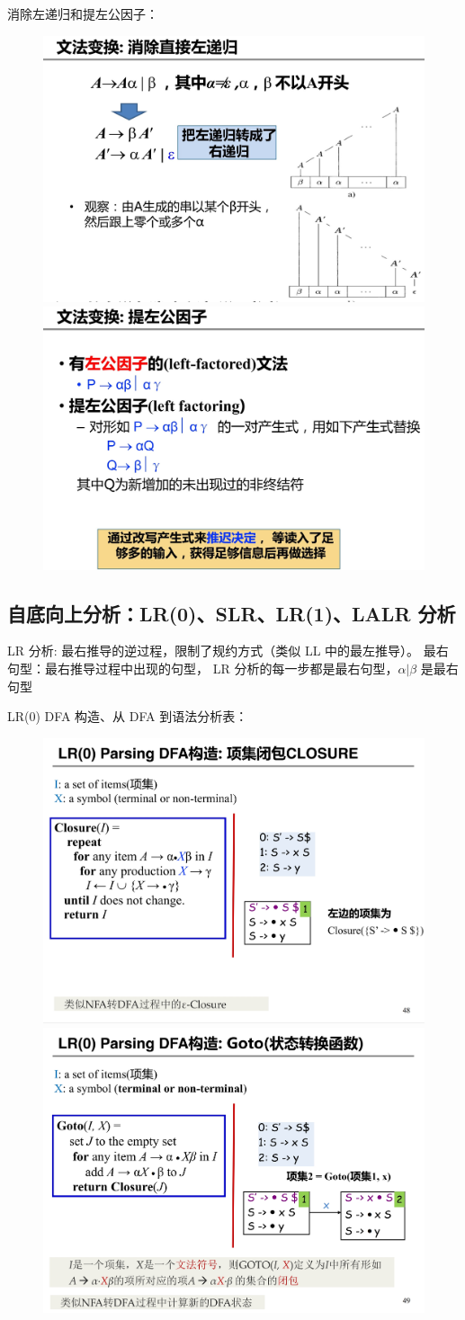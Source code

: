 \par \noindent 消除左递归和提左公因子：

\begin{figure}[H]
    \centering
    \includegraphics[width=0.48\linewidth]{figures/ll1gramma2.png}
    \includegraphics[width=0.48\linewidth]{figures/ll1gramma1.png}
\end{figure}

\subsection*{自底向上分析：LR(0)、SLR、LR(1)、LALR 分析}

\par \noindent LR 分析: 最右推导的逆过程，限制了规约方式（类似 LL 中的最左推导）。
最右句型：最右推导过程中出现的句型， LR 分析的每一步都是最右句型，$\alpha | \beta$ 是最右句型

\par \noindent LR(0) DFA 构造、从 DFA 到语法分析表：

\begin{figure}[H]
    \centering
    \includegraphics[width=0.48\linewidth]{figures/lr0-1.png}
    \includegraphics[width=0.48\linewidth]{figures/lr0-2.png}
\end{figure}

